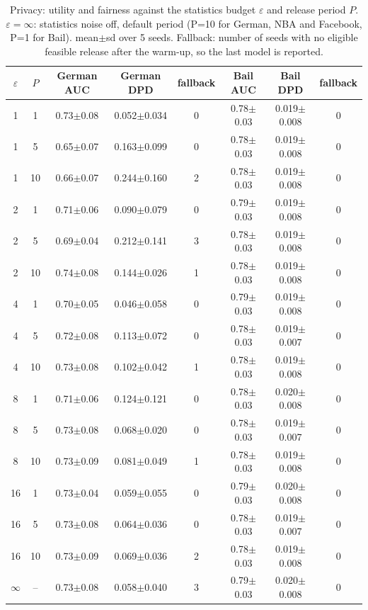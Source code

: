 \begin{table}[tbp]
\centering
\footnotesize
\setlength{\tabcolsep}{3pt}
\caption{Privacy: utility and fairness against the statistics budget $\varepsilon$ and release period $P$. $\varepsilon=\infty$: statistics noise off, default period (P=10 for German, NBA and Facebook, P=1 for Bail). mean$\pm$sd over 5 seeds. Fallback: number of seeds with no eligible feasible release after the warm-up, so the last model is reported.}
\label{tab:e5_privacy}
\begin{tabular}{cccccccc}
\toprule
$\varepsilon$ & $P$ & German AUC & German DPD & fallback & Bail AUC & Bail DPD & fallback \\
\midrule
1 & 1 & 0.73$\pm$0.08 & 0.052$\pm$0.034 & 0 & 0.78$\pm$0.03 & 0.019$\pm$0.008 & 0 \\
1 & 5 & 0.65$\pm$0.07 & 0.163$\pm$0.099 & 0 & 0.78$\pm$0.03 & 0.019$\pm$0.008 & 0 \\
1 & 10 & 0.66$\pm$0.07 & 0.244$\pm$0.160 & 2 & 0.78$\pm$0.03 & 0.019$\pm$0.008 & 0 \\
2 & 1 & 0.71$\pm$0.06 & 0.090$\pm$0.079 & 0 & 0.79$\pm$0.03 & 0.019$\pm$0.008 & 0 \\
2 & 5 & 0.69$\pm$0.04 & 0.212$\pm$0.141 & 3 & 0.78$\pm$0.03 & 0.019$\pm$0.008 & 0 \\
2 & 10 & 0.74$\pm$0.08 & 0.144$\pm$0.026 & 1 & 0.78$\pm$0.03 & 0.019$\pm$0.008 & 0 \\
4 & 1 & 0.70$\pm$0.05 & 0.046$\pm$0.058 & 0 & 0.79$\pm$0.03 & 0.019$\pm$0.008 & 0 \\
4 & 5 & 0.72$\pm$0.08 & 0.113$\pm$0.072 & 0 & 0.78$\pm$0.03 & 0.019$\pm$0.007 & 0 \\
4 & 10 & 0.73$\pm$0.08 & 0.102$\pm$0.042 & 1 & 0.78$\pm$0.03 & 0.019$\pm$0.008 & 0 \\
8 & 1 & 0.71$\pm$0.06 & 0.124$\pm$0.121 & 0 & 0.78$\pm$0.03 & 0.020$\pm$0.008 & 0 \\
8 & 5 & 0.73$\pm$0.08 & 0.068$\pm$0.020 & 0 & 0.78$\pm$0.03 & 0.019$\pm$0.007 & 0 \\
8 & 10 & 0.73$\pm$0.09 & 0.081$\pm$0.049 & 1 & 0.78$\pm$0.03 & 0.019$\pm$0.008 & 0 \\
16 & 1 & 0.73$\pm$0.04 & 0.059$\pm$0.055 & 0 & 0.79$\pm$0.03 & 0.020$\pm$0.008 & 0 \\
16 & 5 & 0.73$\pm$0.08 & 0.064$\pm$0.036 & 0 & 0.78$\pm$0.03 & 0.019$\pm$0.007 & 0 \\
16 & 10 & 0.73$\pm$0.09 & 0.069$\pm$0.036 & 2 & 0.78$\pm$0.03 & 0.019$\pm$0.008 & 0 \\
$\infty$ & -- & 0.73$\pm$0.08 & 0.058$\pm$0.040 & 3 & 0.79$\pm$0.03 & 0.020$\pm$0.008 & 0 \\

\end{tabular}
\end{table}
